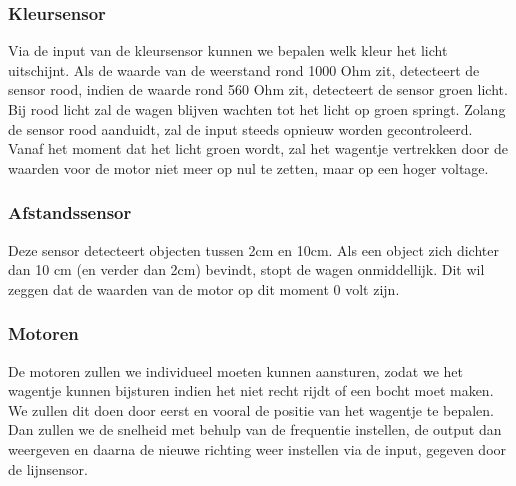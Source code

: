 \documentclass[kulak]{kulakarticle} %
\begin{document}
\subsubsection{Kleursensor}
Via de input van de kleursensor kunnen we bepalen welk kleur het licht uitschijnt. Als de waarde van de weerstand rond 1000 Ohm zit, detecteert de sensor rood, indien de waarde rond 560 Ohm zit, detecteert de sensor groen licht. Bij rood licht zal de wagen blijven wachten tot het licht op groen springt. Zolang de sensor rood aanduidt, zal de input steeds opnieuw worden gecontroleerd. Vanaf het moment dat het licht groen wordt, zal het wagentje vertrekken door de waarden voor de motor niet meer op nul te zetten, maar op een hoger voltage.
\subsubsection{Afstandssensor}
Deze sensor detecteert objecten tussen 2cm en 10cm. Als een object zich dichter dan 10 cm (en verder dan 2cm) bevindt, stopt de wagen onmiddellijk. Dit wil zeggen dat de waarden van de motor op dit moment 0 volt zijn.
\subsubsection{Motoren}
De motoren zullen we individueel moeten kunnen aansturen, zodat we het wagentje  kunnen bijsturen indien het niet recht rijdt of een bocht moet maken. We zullen dit doen door eerst en vooral de positie van het wagentje te bepalen. Dan zullen we de snelheid met behulp van de frequentie instellen, de output dan weergeven en daarna de nieuwe richting weer instellen via de input, gegeven door de lijnsensor. 
\end{document}
